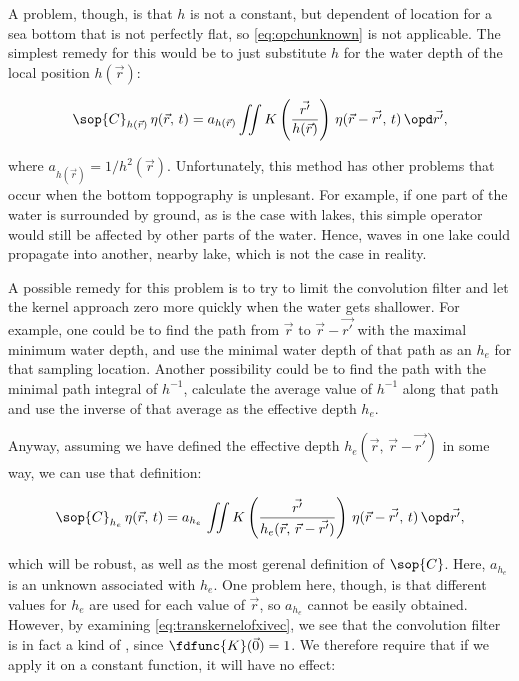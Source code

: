 A problem, though, is that $h$ is not a constant, but dependent of location for a sea bottom that is not perfectly flat, so \eqref{eq:opchunknown} is not applicable. The simplest remedy for this would be to just substitute $h$ for the water depth of the local position $h(\vec{r})$:

\begin{equation} \label{eq:opchlocal}
\sop{C}_{h(\vec{r})}\,\eta(\vec{r},\,t) = a_{h(\vec{r})}\iint K\left(\frac{\vec{r'}}{h(\vec{r})}\right)\,\eta(\vec{r}-\vec{r'},\,t)\,\opd\vec{r'},
\end{equation}

where $a_{h(\vec{r})} = 1/h^2(\vec{r})$. Unfortunately, this method has other problems that occur when the bottom toppography is unplesant. For example, if one part of the water is surrounded by ground, as is the case with lakes, this simple operator would still be affected by other parts of the water. Hence, waves in one lake could propagate into another, nearby lake, which is not the case in reality.

A possible remedy for this problem is to try to limit the convolution filter and let the kernel approach zero more quickly when the water gets shallower. For example, one could be to find the path from $\vec{r}$ to $\vec{r}-\vec{r'}$ with the maximal minimum water depth, and use the minimal water depth of that path as an  $h_e$ for that sampling location. Another possibility could be to find the path with the minimal path integral of $h^{-1}$, calculate the average value of $h^{-1}$ along that path and use the inverse of that average as the effective depth $h_e$.


Anyway, assuming we have defined the effective depth \mbox{$h_e(\vec{r},\,\vec{r}-\vec{r'})$} in some way, we can use that definition:

\begin{equation} \label{eq:opcheffective}
\sop{C}_{h_e}\,\eta(\vec{r},\,t) = a_{h_e}\,\iint K\left(\frac{\vec{r'}}{h_e(\vec{r},\,\vec{r}-\vec{r'})}\right)\,\eta(\vec{r}-\vec{r'},\,t)\,\opd\vec{r'},
\end{equation}

which will be robust, as well as the most gerenal definition of $\sop{C}$. Here, $a_{h_e}$ is an unknown  associated with $h_e$. One problem here, though, is that different values for $h_e$ are used for each value of $\vec{r}$, so $a_{h_e}$ cannot be easily obtained. However, by examining \eqref{eq:transkernelofxivec}, we see that the convolution filter is in fact a kind of , since $\fdfunc{K}(\vec{0}) = 1$. We therefore require that if we apply it on a constant function, it will have no effect:

